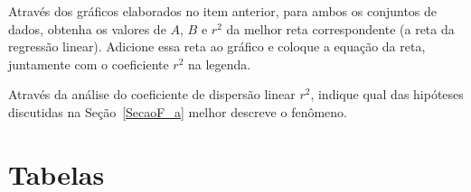 \begin{question}[type={exam}]
Através dos gráficos elaborados no item anterior, para ambos os conjuntos de dados, obtenha os valores de $A$, $B$ e $r^2$ da melhor reta correspondente (a reta da regressão linear). Adicione essa reta ao gráfico e coloque a equação da reta, juntamente com o coeficiente $r^2$ na legenda.
\end{question}

\begin{question}[type={exam}]
Através da análise do coeficiente de dispersão linear $r^2$, indique qual das hipóteses discutidas na Seção~\ref{SecaoF_a} melhor descreve o fenômeno.
\end{question}
\vfill

\pagebreak
\section{Tabelas}

